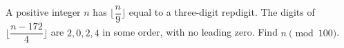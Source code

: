 A positive integer $n$ has $\lfloor\dfrac{n}{9}\rfloor$ equal to a three-digit repdigit. The digits of $\lfloor\dfrac{n-172}{4}\rfloor$ are $2,0,2,4$ in some order, with no leading zero. Find $n\pmod{100}$.
